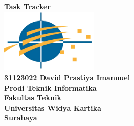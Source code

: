 \documentclass[a4paper,12pt]{article}
\begin{document}
\vspace*{2cm}

\begin{center}
    {\LARGE \textbf{Task Tracker}}\\[1.5em]
    \includegraphics[width=0.35\textwidth]{assets/uwika_logo.png}\\[2em]
    {\Large \textbf{31123022 David Prastiya Imannuel}}\\[1.5em]
    {\Large \textbf{Prodi Teknik Informatika}}\\[1.5em]
    {\Large \textbf{Fakultas Teknik}}\\[1.5em]
    {\Large \textbf{Universitas Widya Kartika}}\\[1.5em]
    {\Large \textbf{Surabaya}}
\end{center}

\pagebreak


\pagebreak

\pagebreak

\end{document}
